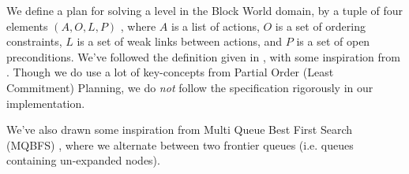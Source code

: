 \documentclass[Main]{subfiles}
\begin{document}


We define a plan for solving a level in the Block World domain, by a tuple of four elements $(A,O,L,P)$ \citep{Weld1994}\citep{Russell2003}, where $A$ is a list of actions, $O$ is a set of ordering constraints, $L$ is a set of weak links between actions, and $P$ is a set of open preconditions. 
We've followed the definition given in \cite{Russell2003}, with some inspiration from \cite{Weld1994}.
Though we do use a lot of key-concepts from Partial Order (Least Commitment) Planning, we do \textit{not} follow the specification rigorously in our implementation.

We've also drawn some inspiration from Multi Queue Best First Search (MQBFS) \citep[p.~38]{hector2013a}, where we alternate between two frontier queues (i.e. queues containing un-expanded nodes).


\end{document}
